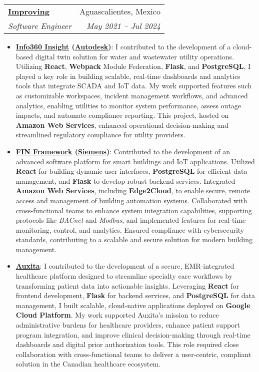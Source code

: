\documentclass[letterpaper,11pt]{article}
\makeatletter
\newcommand{\resumeItem}[2]{
  \item\small{
    \textbf{#1}{: #2 \vspace{-2pt}}
  }
}
\newcommand{\resumeSubheading}[4]{
  \vspace{-1pt}\item
    \begin{tabular*}{0.97\textwidth}[t]{l@{\extracolsep{\fill}}r}
      \textbf{#1} & #2 \\
      \textit{\small#3} & \textit{\small #4} \\
    \end{tabular*}\vspace{-5pt}
}
\newcommand{\resumeItemListStart}{\begin{itemize}}
\newcommand{\resumeItemListEnd}{\end{itemize}\vspace{-5pt}}
\makeatother
\begin{document}
  \resumeSubheading
    {\href{https://www.improving.com/}{Improving}}{Aguascalientes, Mexico}
    {Software Engineer}{May 2021 -- Jul 2024}
    \resumeItemListStart
      \resumeItem{\href{https://www.autodesk.com/products/info360-insight/overview}{Info360 Insight} (\href{https://www.autodesk.com/}{Autodesk})}
        {I contributed to the development of a cloud-based digital twin solution for water and wastewater utility operations. Utilizing \textbf{React}, \textbf{Webpack} Module Federation, \textbf{Flask}, and \textbf{PostgreSQL}, I played a key role in building scalable, real-time dashboards and analytics tools that integrate SCADA and IoT data. My work supported features such as customizable workspaces, incident management workflows, and advanced analytics, enabling utilities to monitor system performance, assess outage impacts, and automate compliance reporting. This project, hosted on \textbf{Amazon Web Services}, enhanced operational decision-making and streamlined regulatory compliance for utility providers.}
      \resumeItem{\href{https://www.j2inn.com/finframework}{FIN Framework} (\href{https://www.siemens.com/}{Siemens})}
        {Contributed to the development of an advanced software platform for smart buildings and IoT applications. Utilized \textbf{React} for building dynamic user interfaces, \textbf{PostgreSQL} for efficient data management, and \textbf{Flask} to develop robust backend services. Integrated \textbf{Amazon Web Services}, including \textbf{Edge2Cloud}, to enable secure, remote access and management of building automation systems. Collaborated with cross-functional teams to enhance system integration capabilities, supporting protocols like \textit{BACnet} and \textit{Modbus}, and implemented features for real-time monitoring, control, and analytics. Ensured compliance with cybersecurity standards, contributing to a scalable and secure solution for modern building management.}
      \resumeItem{\href{https://auxita.com/}{Auxita}}
        {I contributed to the development of a secure, EMR-integrated healthcare platform designed to streamline specialty care workflows by transforming patient data into actionable insights. Leveraging \textbf{React} for frontend development, \textbf{Flask} for backend services, and \textbf{PostgreSQL} for data management, I built scalable, cloud-native applications deployed on \textbf{Google Cloud Platform}. My work supported Auxita’s mission to reduce administrative burdens for healthcare providers, enhance patient support program integration, and improve clinical decision-making through real-time dashboards and digital prior authorization tools. This role required close collaboration with cross-functional teams to deliver a user-centric, compliant solution in the Canadian healthcare ecosystem.}
    \resumeItemListEnd
\end{document}
